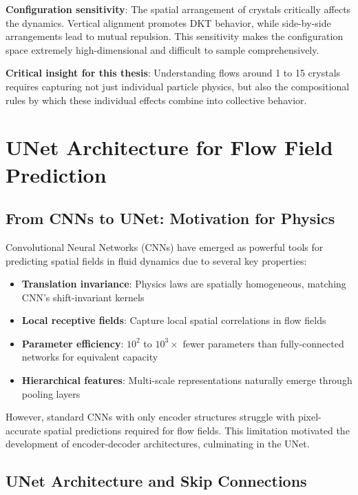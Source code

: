 \textbf{Configuration sensitivity}: The spatial arrangement of crystals critically affects the dynamics. Vertical alignment promotes DKT behavior, while side-by-side arrangements lead to mutual repulsion. This sensitivity makes the configuration space extremely high-dimensional and difficult to sample comprehensively.

\textbf{Critical insight for this thesis}: Understanding flows around 1 to 15 crystals requires capturing not just individual particle physics, but also the compositional rules by which these individual effects combine into collective behavior.

\section{UNet Architecture for Flow Field Prediction}
\label{sec:unet}

\subsection{From CNNs to UNet: Motivation for Physics}

Convolutional Neural Networks (CNNs) have emerged as powerful tools for predicting spatial fields in fluid dynamics due to several key properties:

\begin{itemize}
    \item \textbf{Translation invariance}: Physics laws are spatially homogeneous, matching CNN's shift-invariant kernels
    \item \textbf{Local receptive fields}: Capture local spatial correlations in flow fields
    \item \textbf{Parameter efficiency}: $10^2$ to $10^3\times$ fewer parameters than fully-connected networks for equivalent capacity
    \item \textbf{Hierarchical features}: Multi-scale representations naturally emerge through pooling layers
\end{itemize}

However, standard CNNs with only encoder structures struggle with pixel-accurate spatial predictions required for flow fields. This limitation motivated the development of encoder-decoder architectures, culminating in the UNet.

\subsection{UNet Architecture and Skip Connections}

